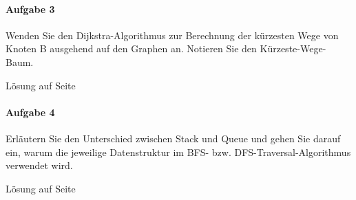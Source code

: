 \documentclass[11pt,a4paper]{scrartcl}
\begin{document}
\paragraph{Aufgabe 3} Wenden Sie den Dijkstra-Algorithmus zur Berechnung der kürzesten Wege von Knoten B ausgehend auf den Graphen an. Notieren Sie den Kürzeste-Wege-Baum.
\begin{flushright}
Lösung auf Seite \pageref{a6.3:lsg} \\
\end{flushright}
\paragraph{Aufgabe 4} Erläutern Sie den Unterschied zwischen Stack und Queue und gehen Sie darauf ein, warum die jeweilige Datenstruktur im BFS- bzw. DFS-Traversal-Algorithmus verwendet wird.
\begin{flushright}
Lösung auf Seite \pageref{a6.4:lsg} \\
\end{flushright}
\pagebreak
\end{document}
